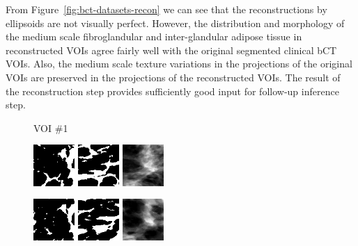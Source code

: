 \documentclass[journal]{IEEEtran}
\begin{document}
From Figure~\ref{fig:bct-datasets-recon} we can see that the
reconstructions by ellipsoids are not visually perfect. However, the
distribution and morphology of the medium scale fibroglandular and
inter-glandular adipose tissue in reconstructed VOIs agree fairly well
with the original segmented clinical bCT VOIs. Also, the medium scale
texture variations in the projections of the original VOIs are
preserved in the projections of the reconstructed VOIs. The result of
the reconstruction step provides sufficiently good input for follow-up
inference step.

\begin{figure}[!htb]

  \centering \captionsetup[subfloat]{labelformat=empty}

  {\fontsize{9}{9}\selectfont VOI \#1} \vspace{1mm}

   \includegraphics[width=0.14\textwidth]
  {figure/all/dataset_3/roi_coronal}
  \includegraphics[width=0.14\textwidth]
  {figure/all/dataset_3/roi_saggital}
  \includegraphics[width=0.14\textwidth]
  {figure/all/dataset_3/proj_roi}

  \includegraphics[width=0.14\textwidth]
  {figure/all/dataset_3/model_coronal}
  \includegraphics[width=0.14\textwidth]
  {figure/all/dataset_3/model_saggital}
  \includegraphics[width=0.14\textwidth]
  {figure/all/dataset_3/proj_roi_inten10}


\end{figure}
\end{document}
